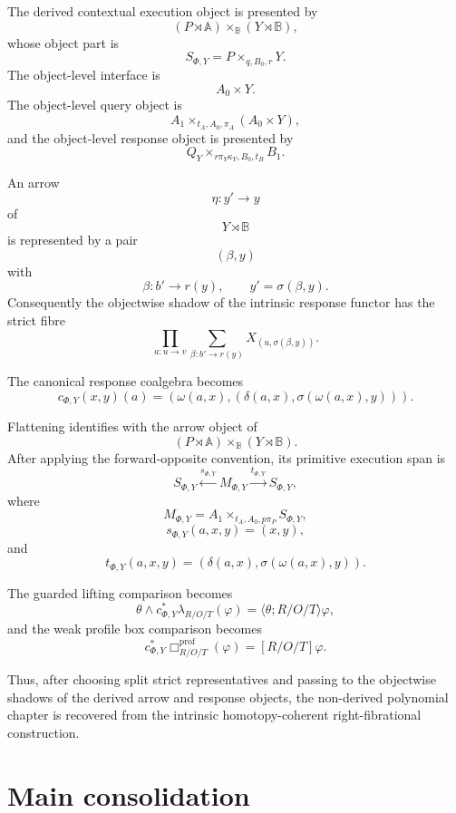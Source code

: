 The derived contextual execution object is presented by
\[
(P\rtimes\mathbb A)\times_{\mathbb B}(Y\rtimes\mathbb B),
\]
whose object part is
\[
S_{\Phi,Y}
=
P\times_{q,B_0,r}Y.
\]
The object-level interface is
\[
A_0\times Y.
\]
The object-level query object is
\[
A_1\times_{t_A,A_0,\pi_A}(A_0\times Y),
\]
and the object-level response object is presented by
\[
Q_Y\times_{r\pi_Y\kappa_Y,B_0,t_B}B_1.
\]

An arrow
\[
\eta:y'\to y
\]
of
\[
Y\rtimes\mathbb B
\]
is represented by a pair
\[
(\beta,y)
\]
with
\[
\beta:b'\to r(y),
\qquad
y'=\sigma(\beta,y).
\]
Consequently the objectwise shadow of the intrinsic response functor has the
strict fibre
\[
\prod_{a:u\to v}
\sum_{\beta:b'\to r(y)}
X_{(u,\sigma(\beta,y))}.
\]

The canonical response coalgebra becomes
\[
c_{\Phi,Y}(x,y)(a)
=
\left(
\omega(a,x),
\left(
\delta(a,x),
\sigma(\omega(a,x),y)
\right)
\right).
\]

Flattening identifies with the arrow object of
\[
(P\rtimes\mathbb A)\times_{\mathbb B}(Y\rtimes\mathbb B).
\]
After applying the forward-opposite convention, its primitive execution span is
\[
S_{\Phi,Y}
\xleftarrow{s_{\Phi,Y}}
M_{\Phi,Y}
\xrightarrow{t_{\Phi,Y}}
S_{\Phi,Y},
\]
where
\[
M_{\Phi,Y}
=
A_1\times_{t_A,A_0,p\pi_P}S_{\Phi,Y},
\]
\[
s_{\Phi,Y}(a,x,y)=(x,y),
\]
and
\[
t_{\Phi,Y}(a,x,y)
=
\left(
\delta(a,x),
\sigma(\omega(a,x),y)
\right).
\]

The guarded lifting comparison becomes
\[
\theta\wedge
c_{\Phi,Y}^{\ast}\lambda_{R/O/T}(\varphi)
=
\langle\theta;R/O/T\rangle\varphi,
\]
and the weak profile box comparison becomes
\[
c_{\Phi,Y}^{\ast}
\Box^{\mathrm{prof}}_{R/O/T}(\varphi)
=
[R/O/T]\varphi.
\]

Thus, after choosing split strict representatives and passing to the
objectwise shadows of the derived arrow and response objects, the non-derived
polynomial chapter is recovered from the intrinsic homotopy-coherent
right-fibrational construction.

\section{Main consolidation}
\label{sec:derived-poly-main-consolidation}

